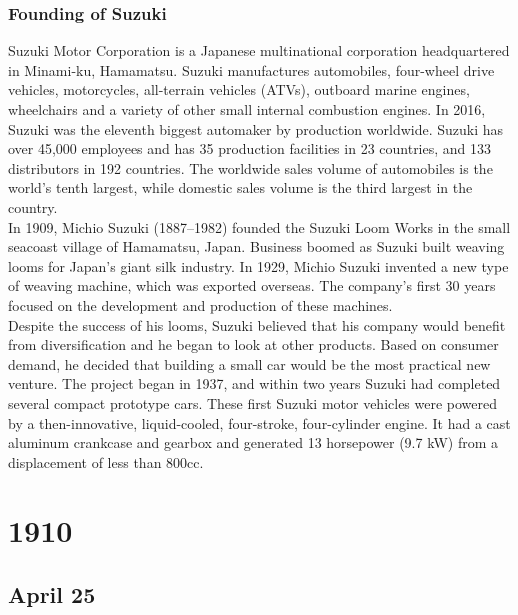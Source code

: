 \documentclass[11pt]{report}
\begin{document}
\subsection{Founding of Suzuki}
Suzuki Motor Corporation is a Japanese multinational corporation headquartered in Minami-ku, Hamamatsu. Suzuki manufactures automobiles, four-wheel drive vehicles, motorcycles, all-terrain vehicles (ATVs), outboard marine engines, wheelchairs and a variety of other small internal combustion engines. In 2016, Suzuki was the eleventh biggest automaker by production worldwide. Suzuki has over 45,000 employees and has 35 production facilities in 23 countries, and 133 distributors in 192 countries. The worldwide sales volume of automobiles is the world's tenth largest, while domestic sales volume is the third largest in the country.\\ \indent In 1909, Michio Suzuki (1887–1982) founded the Suzuki Loom Works in the small seacoast village of Hamamatsu, Japan. Business boomed as Suzuki built weaving looms for Japan's giant silk industry. In 1929, Michio Suzuki invented a new type of weaving machine, which was exported overseas. The company's first 30 years focused on the development and production of these machines.\\ \indent Despite the success of his looms, Suzuki believed that his company would benefit from diversification and he began to look at other products. Based on consumer demand, he decided that building a small car would be the most practical new venture. The project began in 1937, and within two years Suzuki had completed several compact prototype cars. These first Suzuki motor vehicles were powered by a then-innovative, liquid-cooled, four-stroke, four-cylinder engine. It had a cast aluminum crankcase and gearbox and generated 13 horsepower (9.7 kW) from a displacement of less than 800cc.

\chapter{1910}
\section{April 25}
\end{document}

